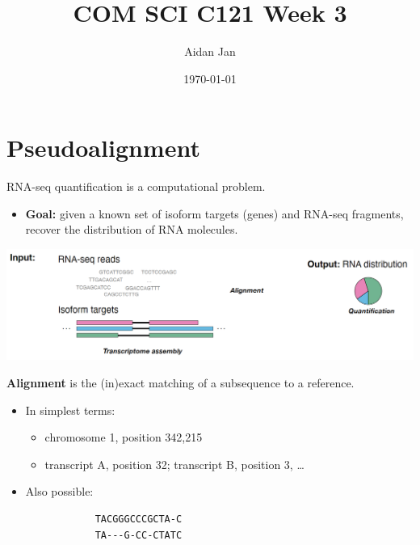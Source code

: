 \documentclass[10pt]{article}
\title{COM SCI C121 Week 3}
\author{Aidan Jan}
\date{\today}
\begin{document}
\maketitle

\section*{Pseudoalignment}
RNA-seq quantification is a computational problem.
\begin{itemize}
    \item \textbf{Goal:} given a known set of isoform targets (genes) and RNA-seq fragments, recover the distribution of RNA molecules.
\end{itemize}
\begin{center}
    \includegraphics*[scale=0.5]{W4_1.png}
\end{center}
\textbf{Alignment} is the (in)exact matching of a subsequence to a reference.
\begin{itemize}
    \item In simplest terms:
    \begin{itemize}
        \item chromosome 1, position 342,215
        \item transcript A, position 32; transcript B, position 3, \dots
    \end{itemize}
    \item Also possible:
    \begin{verbatim}
            TACGGGCCCGCTA-C
            TA---G-CC-CTATC
    \end{verbatim}
\end{itemize}
\end{document}
